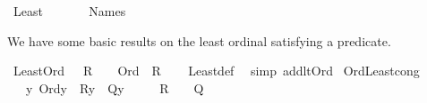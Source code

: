 %
\begin{isabellebody}%
%
%
\isadelimdocument
%
\endisadelimdocument
%
\isatagdocument
%
\isamarkuptrue%
%
\endisatagdocument
{\isafolddocument}%
%
\isadelimdocument
%
\endisadelimdocument
%
\isadelimtheory
%
\endisadelimtheory
%
\isatagtheory
{}\isamarkupfalse%
\ Least\isanewline
\ \ \isanewline
\ \ \ \ Names\isanewline
\isanewline
{}%
\endisatagtheory
{\isafoldtheory}%
%
\isadelimtheory
%
\endisadelimtheory
%
\begin{isamarkuptext}%
We have some basic results on the least ordinal satisfying
a predicate.%
\end{isamarkuptext}\isamarkuptrue%
\isamarkupfalse%
\ Least{\isacharunderscore}{\kern0pt}Ord{\isacharcolon}{\kern0pt}\ {\isachardoublequoteopen}{\isacharparenleft}{\kern0pt}{\isasymmu}\ {\isasymalpha}{\isachardot}{\kern0pt}\ R{\isacharparenleft}{\kern0pt}{\isasymalpha}{\isacharparenright}{\kern0pt}{\isacharparenright}{\kern0pt}\ {\isacharequal}{\kern0pt}\ {\isacharparenleft}{\kern0pt}{\isasymmu}\ {\isasymalpha}{\isachardot}{\kern0pt}\ Ord{\isacharparenleft}{\kern0pt}{\isasymalpha}{\isacharparenright}{\kern0pt}\ {\isasymand}\ R{\isacharparenleft}{\kern0pt}{\isasymalpha}{\isacharparenright}{\kern0pt}{\isacharparenright}{\kern0pt}{\isachardoublequoteclose}\isanewline
%
\isadelimproof
\ \ %
\endisadelimproof
%
\isatagproof
{}\isamarkupfalse%
\ Least{\isacharunderscore}{\kern0pt}def\ \isamarkupfalse%
\ {\isacharparenleft}{\kern0pt}simp\ add{\isacharcolon}{\kern0pt}lt{\isacharunderscore}{\kern0pt}Ord{\isacharparenright}{\kern0pt}%
\endisatagproof
{\isafoldproof}%
%
\isadelimproof
\isanewline
%
\endisadelimproof
\isanewline
{}\isamarkupfalse%
\ Ord{\isacharunderscore}{\kern0pt}Least{\isacharunderscore}{\kern0pt}cong{\isacharcolon}{\kern0pt}\ \isanewline
\ \ \ {\isachardoublequoteopen}{\isasymAnd}y{\isachardot}{\kern0pt}\ Ord{\isacharparenleft}{\kern0pt}y{\isacharparenright}{\kern0pt}\ {\isasymLongrightarrow}\ R{\isacharparenleft}{\kern0pt}y{\isacharparenright}{\kern0pt}\ {\isasymlongleftrightarrow}\ Q{\isacharparenleft}{\kern0pt}y{\isacharparenright}{\kern0pt}{\isachardoublequoteclose}\isanewline
\ \ \ {\isachardoublequoteopen}{\isacharparenleft}{\kern0pt}{\isasymmu}\ {\isasymalpha}{\isachardot}{\kern0pt}\ R{\isacharparenleft}{\kern0pt}{\isasymalpha}{\isacharparenright}{\kern0pt}{\isacharparenright}{\kern0pt}\ {\isacharequal}{\kern0pt}\ {\isacharparenleft}{\kern0pt}{\isasymmu}\ {\isasymalpha}{\isachardot}{\kern0pt}\ Q{\isacharparenleft}{\kern0pt}{\isasymalpha}{\isacharparenright}{\kern0pt}{\isacharparenright}{\kern0pt}{\isachardoublequoteclose}\isanewline

\end{isabellebody}
